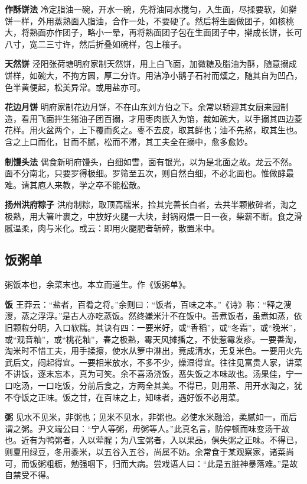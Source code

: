 \documentclass[]{article}
\begin{document}
\textbf{作酥饼法}
冷定脂油一碗，开水一碗，先将油同水搅匀，入生面，尽揉要软，如擀饼一样，外用蒸熟面入脂油，合作一处，不要硬了。然后将生面做团子，如核桃大，将熟面亦作团子，略小一晕，再将熟面团子包在生面团子中，擀成长饼，长可八寸，宽二三寸许，然后折叠如碗样，包上穰子。

\textbf{天然饼}
泾阳张荷塘明府家制天然饼，用上白飞面，加微糖及脂油为酥，随意搦成饼样，如碗大，不拘方圆，厚二分许。用洁净小鹅子石衬而熯之，随其自为凹凸，色半黄便起，松美异常。或用盐亦可。

\textbf{花边月饼}
明府家制花边月饼，不在山东刘方伯之下。余常以轿迎其女厨来园制造，看用飞面拌生猪油子团百搦，才用枣肉嵌入为馅，裁如碗大，以手搦其四边菱花样。用火盆两个，上下覆而炙之。枣不去皮，取其鲜也；油不先熬，取其生也。含之上口而化，甘而不腻，松而不滞，其工夫全在搦中，愈多愈妙。

\textbf{制馒头法}
偶食新明府馒头，白细如雪，面有银光，以为是北面之故。龙云不然。面不分南北，只要罗得极细。罗筛至五次，则自然白细，不必北面也。惟做酵最难。请其庖人来教，学之卒不能松散。

\textbf{扬州洪府粽子}
洪府制粽，取顶高糯米，捡其完善长白者，去共半颗散碎者，淘之极熟，用大箸叶裹之，中放好火腿一大块，封锅闷煨一日一夜，柴薪不断。食之滑腻温柔，肉与米化。或云：即用火腿肥者斩碎，散置米中。

\hypertarget{header-n33}{%
\subsection{饭粥单}\label{header-n33}}

粥饭本也，余菜末也。本立而道生。作《饭粥单》。

\textbf{饭}
王莽云：``盐者，百肴之将。''余则曰：``饭者，百味之本。''《诗》称：``释之溲溲，蒸之浮浮。''是古人亦吃蒸饭。然终嫌米汁不在饭中。善煮饭者，虽煮如蒸，依旧颗粒分明，入口软糯。其诀有四：一要米好，或``香稻''，或``冬霜''，或``晚米''，或``观音籼''，或``桃花籼''，春之极熟，霉天风摊播之，不使惹霉发疹。一要善淘，淘米时不惜工夫，用手揉擦，使水从箩中淋出，竟成清水，无复米色。一要用火先武后文，闷起得宜。一要相米放水，不多不少，燥湿得宜。往往见富贵人家，讲菜不讲饭，逐末忘本，真为可笑。余不喜汤浇饭，恶失饭之本味故也。汤果佳，宁一口吃汤，一口吃饭，分前后食之，方两全其美。不得已，则用茶、用开水淘之，犹不夺饭之正味。饭之甘，在百味之上，知味者，遇好饭不必用菜。

\textbf{粥}
见水不见米，非粥也；见米不见水，非粥也。必使水米融洽，柔腻如一，而后谓之粥。尹文端公曰：``宁人等粥，毋粥等人。''此真名言，防停顿而味变汤干故也。近有为鸭粥者，入以荤腥；为八宝粥者，入以果品，俱失粥之正味。不得已，则夏用绿豆，冬用黍米，以五谷入五谷，尚属不妨。余常食于某观察家，诸菜尚可，而饭粥粗粝，勉强咽下，归而大病。尝戏语人曰：``此是五脏神暴落难。''是故自禁受不得。
\end{document}

